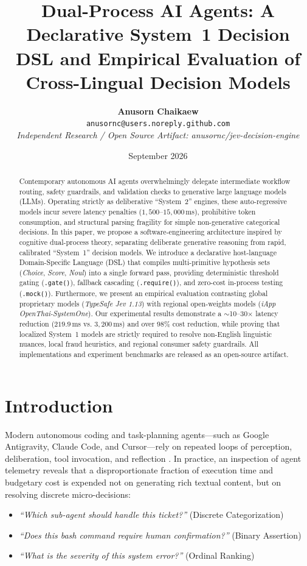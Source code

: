 \documentclass[10pt,twocolumn,letterpaper]{article}
\title{\textbf{Dual-Process AI Agents: A Declarative System~1 Decision DSL and Empirical Evaluation of Cross-Lingual Decision Models}}
\author{
  \textbf{Anusorn Chaikaew}\\
  \texttt{anusornc@users.noreply.github.com}\\
  \textit{Independent Research / Open Source Artifact: anusornc/jev-decision-engine}
}
\date{September 2026}
\begin{document}
\maketitle

\begin{abstract}
Contemporary autonomous AI agents overwhelmingly delegate intermediate workflow routing, safety guardrails, and validation checks to generative large language models (LLMs). Operating strictly as deliberative ``System~2'' engines, these auto-regressive models incur severe latency penalties ($1{,}500$--$15{,}000$\,ms), prohibitive token consumption, and structural parsing fragility for simple non-generative categorical decisions. In this paper, we propose a software-engineering architecture inspired by cognitive dual-process theory, separating deliberate generative reasoning from rapid, calibrated ``System~1'' decision models. We introduce a declarative host-language Domain-Specific Language (DSL) that compiles multi-primitive hypothesis sets (\textit{Choice}, \textit{Score}, \textit{Noul}) into a single forward pass, providing deterministic threshold gating (\texttt{.gate()}), fallback cascading (\texttt{.require()}), and zero-cost in-process testing (\texttt{.mock()}). Furthermore, we present an empirical evaluation contrasting global proprietary models (\textit{TypeSafe Jev 1.13}) with regional open-weights models (\textit{iApp OpenThai-SystemOne}). Our experimental results demonstrate a $\sim$10--30$\times$ latency reduction ($219.9$\,ms vs. $3{,}200$\,ms) and over 98\% cost reduction, while proving that localized System~1 models are strictly required to resolve non-English linguistic nuances, local fraud heuristics, and regional consumer safety guardrails. All implementations and experiment benchmarks are released as an open-source artifact.
\end{abstract}

\section{Introduction}
Modern autonomous coding and task-planning agents—such as Google Antigravity, Claude Code, and Cursor—rely on repeated loops of perception, deliberation, tool invocation, and reflection \cite{schick2023toolformer, shinn2024reflexion}. In practice, an inspection of agent telemetry reveals that a disproportionate fraction of execution time and budgetary cost is expended not on generating rich textual content, but on resolving discrete micro-decisions:
\begin{itemize}
    \item \textit{``Which sub-agent should handle this ticket?''} (Discrete Categorization)
    \item \textit{``Does this bash command require human confirmation?''} (Binary Assertion)
    \item \textit{``What is the severity of this system error?''} (Ordinal Ranking)
\end{itemize}
\end{document}
